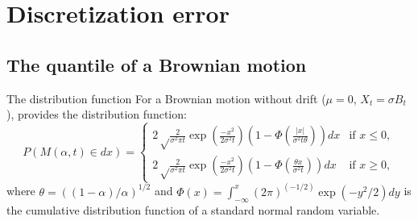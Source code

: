 \documentclass[cjk,10pt]{beamer}
\begin{document}
\section{Discretization error}


\subsection{The quantile of a Brownian motion}
\begin{frame}{The distribution function}
For a Brownian motion without drift ($\mu=0$, $X_t=\sigma B_t$), \cite{Yor1995} provides the distribution function:
\vspace{1em}
{\small
\begin{equation}
P(M(\alpha,t)\in dx)= \begin{cases}
\displaystyle 2\sqrt\frac{2}{\sigma^2\pi t}\exp\left(\frac{-x^2} {2\sigma^2 t}\right)\left(1-\Phi\left(\frac{|x|} {\sigma^2 t\theta}\right)\right)dx  &  \text{if } x \leq 0 ,\\
\displaystyle 2\sqrt\frac{2}{\sigma^2\pi t}\exp\left(\frac{-x^2} {2\sigma^2 t}\right)\left(1-\Phi\left(\frac{\theta x}{\sigma^2 t}\right)\right)dx  & \text{if } x \geq 0,
\end{cases}
\end{equation}
}
where $\theta = ((1 - \alpha)/\alpha)^{1/2}$ and $\Phi(x)=\int^{x}_{-\infty}(2\pi)^{(-1/2)}\exp(-y^2 /2)dy$ is the cumulative distribution function of a standard normal random variable.
\end{frame}
\end{document}
